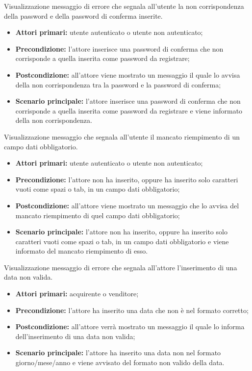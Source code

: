 \label{estensione:password-conferma-diverse}

Visualizzazione messaggio di errore che segnala all'utente la non corrispondenza della password e della password di conferma inserite.
\begin{itemize}
    \item \textbf{Attori primari:} utente autenticato o utente non autenticato;
    \item \textbf{Precondizione:} l'attore inserisce una password di conferma che non corrisponde a quella inserita come password da registrare;
    \item \textbf{Postcondizione:} all'attore viene mostrato un messaggio il quale lo avvisa della non corrispondenza tra la password e la password di conferma;
    \item \textbf{Scenario principale:} l'attore inserisce una password di conferma che non corrisponde a quella inserita come password da registrare e viene informato della non corrispondenza.
\end{itemize}

\label{estensione:campo-obbligatorio-non-inserito}

Visualizzazione messaggio che segnala all'utente il mancato riempimento di un campo dati obbligatorio.
\begin{itemize}
    \item \textbf{Attori primari:} utente autenticato o utente non autenticato;
    \item \textbf{Precondizione:} l'attore non ha inserito, oppure ha inserito solo caratteri vuoti come spazi o tab, in un campo dati obbligatorio;
    \item \textbf{Postcondizione:} all'attore viene mostrato un messaggio che lo avvisa del mancato riempimento di quel campo dati obbligatorio;
    \item \textbf{Scenario principale:} l'attore non ha inserito, oppure ha inserito solo caratteri vuoti come spazi o tab, in un campo dati obbligatorio e viene informato del mancato riempimento di esso.
\end{itemize}

\label{estensione:data-non-valida}

Visualizzazione messaggio di errore che segnala all'attore l'inserimento di una data non valida.
\begin{itemize}
    \item \textbf{Attori primari:} acquirente o venditore;
    \item \textbf{Precondizione:} l'attore ha inserito una data che non è nel formato corretto;
    \item \textbf{Postcondizione:} all'attore verrà mostrato un messaggio il quale lo informa dell'inserimento di una data non valida;
    \item \textbf{Scenario principale:} l'attore ha inserito una data non nel formato giorno/mese/anno e viene avvisato del formato non valido della data.
\end{itemize}

